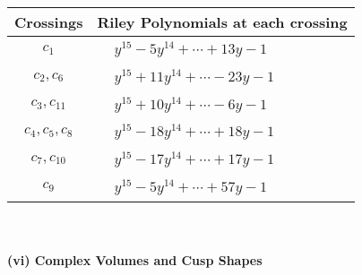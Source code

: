 \documentclass[1p]{elsarticle_modified}
\theoremstyle{definition}
\begin{document}
\begin{tabular}{m{50pt}|m{274pt}}
Crossings & \hspace{64pt}Riley Polynomials at each crossing \\
\hline $$\begin{aligned}c_{1}\end{aligned}$$&$\begin{aligned}
&y^{15}-5 y^{14}+\cdots+13 y-1
\end{aligned}$\\
\hline $$\begin{aligned}c_{2},c_{6}\end{aligned}$$&$\begin{aligned}
&y^{15}+11 y^{14}+\cdots-23 y-1
\end{aligned}$\\
\hline $$\begin{aligned}c_{3},c_{11}\end{aligned}$$&$\begin{aligned}
&y^{15}+10 y^{14}+\cdots-6 y-1
\end{aligned}$\\
\hline $$\begin{aligned}c_{4},c_{5},c_{8}\end{aligned}$$&$\begin{aligned}
&y^{15}-18 y^{14}+\cdots+18 y-1
\end{aligned}$\\
\hline $$\begin{aligned}c_{7},c_{10}\end{aligned}$$&$\begin{aligned}
&y^{15}-17 y^{14}+\cdots+17 y-1
\end{aligned}$\\
\hline $$\begin{aligned}c_{9}\end{aligned}$$&$\begin{aligned}
&y^{15}-5 y^{14}+\cdots+57 y-1
\end{aligned}$\\
\hline
\end{tabular}\\~\\
\newpage\flushleft \textbf{(vi) Complex Volumes and Cusp Shapes}
\end{document}
